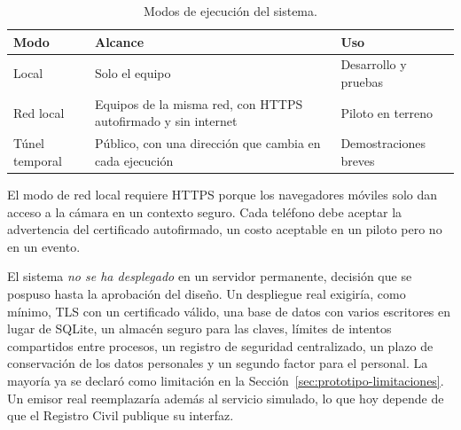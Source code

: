 \begin{table}[htbp]
  \centering
  \caption{Modos de ejecución del sistema.}
  \label{tab:desarrollo-modos}
  \small
  \begin{tabular}{p{2.6cm}p{4.0cm}p{6.8cm}}
    \toprule
    Modo & Alcance & Uso \\
    \midrule
    Local & Solo el equipo & Desarrollo y pruebas \\
    Red local & Equipos de la misma red, con HTTPS autofirmado y sin internet & Piloto en terreno \\
    Túnel temporal & Público, con una dirección que cambia en cada ejecución & Demostraciones breves \\
    \bottomrule
  \end{tabular}
\end{table}

El modo de red local requiere HTTPS porque los navegadores móviles solo dan acceso a la cámara en un contexto
seguro. Cada teléfono debe aceptar la advertencia del certificado autofirmado, un costo aceptable en un piloto pero
no en un evento.

El sistema \emph{no se ha desplegado} en un servidor permanente, decisión que se pospuso hasta la aprobación del
diseño. Un despliegue real exigiría, como mínimo, TLS con un certificado válido, una base de datos con varios
escritores en lugar de SQLite, un almacén seguro para las claves, límites de intentos compartidos entre procesos,
un registro de seguridad centralizado, un plazo de conservación de los datos personales y un segundo factor para el
personal. La mayoría ya se declaró como limitación en la Sección~\ref{sec:prototipo-limitaciones}. Un emisor real
reemplazaría además al servicio simulado, lo que hoy depende de que el Registro Civil publique su interfaz.
